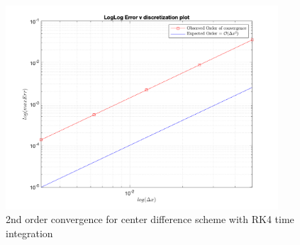 \documentclass[11pt]{article}
\begin{document}
\begin{enumerate}
\begin{enumerate}
    
    \begin{figure}[htp]
        \centering
        \includegraphics[width=4in]{Q1_ErrPlot_RK4.png}
        \caption{2nd order convergence for center difference scheme with RK4 time integration}
        \label{fig:Q1_ErrPlot2}
    \end{figure}    
    \end{enumerate}


\end{enumerate}
\end{document}
